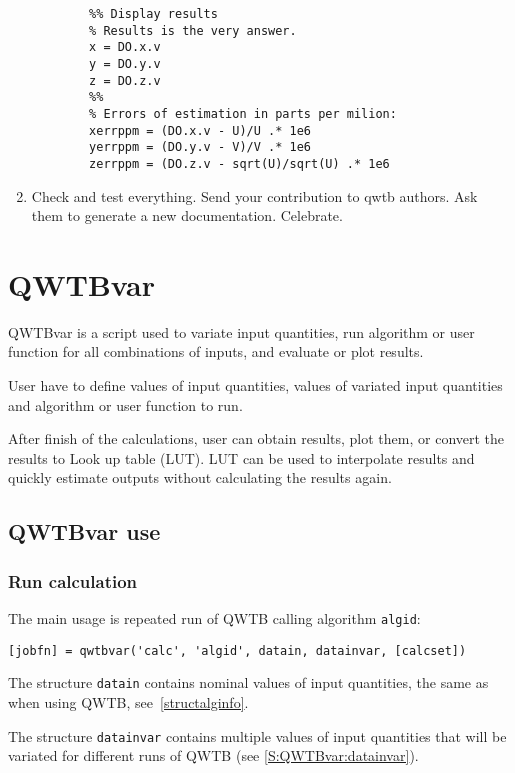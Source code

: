 \documentclass[12pt,a4paper,oneside]{report} %
\newcommand{\li}[1]{\lstinline{#1}}     %
\begin{document}
\begin{enumerate}
\begin{lstlisting}
        %% Display results
        % Results is the very answer.
        x = DO.x.v
        y = DO.y.v
        z = DO.z.v
        %%
        % Errors of estimation in parts per milion:
        xerrppm = (DO.x.v - U)/U .* 1e6
        yerrppm = (DO.y.v - V)/V .* 1e6
        zerrppm = (DO.z.v - sqrt(U)/sqrt(U) .* 1e6
        \end{lstlisting} %

        \item Check and test everything. Send your contribution to qwtb authors. Ask them to
        generate a new documentation. Celebrate.

\end{enumerate}

\chapter{QWTBvar} %
QWTBvar is a script used to variate input quantities, run algorithm or user
function for all combinations of inputs, and evaluate or plot results.

User have to define values of input quantities, values of variated input
quantities and algorithm or user function to run.

After finish of the calculations, user can obtain results, plot them, or
convert the results to Look up table (LUT). LUT can be used to interpolate
results and quickly estimate outputs without calculating the results again.

\section{QWTBvar use} %
\subsection{Run calculation}
\label{S:QWTBvar:calc}
The main usage is repeated run of QWTB calling algorithm \li{algid}:
\begin{lstlisting}
[jobfn] = qwtbvar('calc', 'algid', datain, datainvar, [calcset])
\end{lstlisting}
The structure \li{datain} contains nominal values of input quantities,
the same as when using QWTB, see~\ref{structalginfo}.

The structure \li{datainvar} contains multiple values of input quantities that
will be variated for different runs of QWTB (see \ref{S:QWTBvar:datainvar}).
\end{document}
